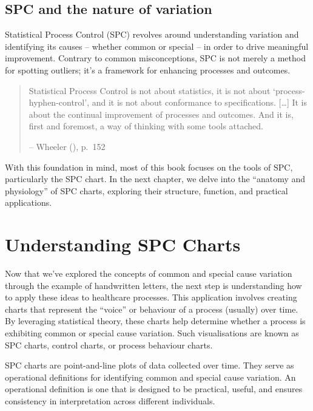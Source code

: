 \documentclass[
]{book}
\begin{document}
\section{SPC and the nature of variation}\label{spc-and-the-nature-of-variation}

Statistical Process Control (SPC) revolves around understanding variation and identifying its causes -- whether common or special -- in order to drive meaningful improvement. Contrary to common misconceptions, SPC is not merely a method for spotting outliers; it's a framework for enhancing processes and outcomes.

\begin{quote}
Statistical Process Control is not about statistics, it is not about `process-hyphen-control', and it is not about conformance to specifications. {[}\ldots{]} It is about the continual improvement of processes and outcomes. And it is, first and foremost, a way of thinking with some tools attached.

-- Wheeler (), p.~152
\end{quote}

With this foundation in mind, most of this book focuses on the tools of SPC, particularly the SPC chart. In the next chapter, we delve into the ``anatomy and physiology'' of SPC charts, exploring their structure, function, and practical applications.

\chapter{Understanding SPC Charts}\label{charts-intro}

Now that we've explored the concepts of common and special cause variation through the example of handwritten letters, the next step is understanding how to apply these ideas to healthcare processes. This application involves creating charts that represent the ``voice'' or behaviour of a process (usually) over time. By leveraging statistical theory, these charts help determine whether a process is exhibiting common or special cause variation. Such visualisations are known as SPC charts, control charts, or process behaviour charts.

SPC charts are point-and-line plots of data collected over time. They serve as operational definitions for identifying common and special cause variation. An operational definition is one that is designed to be practical, useful, and ensures consistency in interpretation across different individuals.
\end{document}
